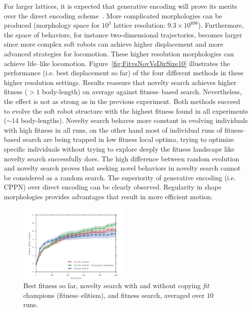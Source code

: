 \documentclass{sig-alternate}
\begin{document}
For larger lattices, it is expected that generative encoding will prove its merits over the direct encoding scheme~\cite{cheney2013unshackling,stanley2007compositional}. More complicated morphologies can be produced (morphology space for $10^3$ lattice resolution: $9.3 \times 10^{698}$). Furthermore, the space of behaviors, for instance two-dimensional trajectories, becomes larger since more complex soft robots can achieve higher displacement and more advanced strategies for locomotion. These higher resolution morphologies can achieve life--like locomotion. Figure~\ref{fig:FitvsNovVsDirSize10} illustrates the performance (i.e. best displacement so far) of the four different methods in these higher resolution settings. Results reassure that novelty search achieves higher fitness ($> 1$ body-length) on average against fitness--based search. Nevertheless, the effect is not as strong as in the previous experiment. Both methods succeed to evolve the soft robot structure with the highest fitness found in all experiments ($\sim 14$ body-lengths). Novelty search behaves more constant in evolving individuals with high fitness in all runs, on the other hand most of individual runs of fitness--based search are being trapped in low fitness local optima, trying to optimize specific individuals without trying to explore deeply the fitness landscape like novelty search successfully does. The high difference between random evolution and novelty search proves that seeking novel behaviors in novelty search cannot be considered as a random search. The superiority of generative encoding (i.e. CPPN) over direct encoding can be clearly observed. Regularity in shape morphologies provides advantages that result in more efficient motion.

\begin{figure}[b!]
\centering
\includegraphics[width=0.5\textwidth]{../Figures/Results/CopyFitChampions10.pdf}
\caption{Best fitness so far, novelty search with and without copying \emph{fit} champions (fitness--elitism), and fitness search, averaged over $10$ runs.}
\label{fig:CopyFitChampions10}
\end{figure}
\end{document}
